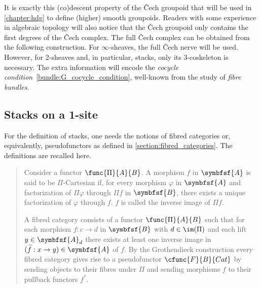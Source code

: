         It is exactly this (co)descent property of the \v{C}ech groupoid that will be used in \cref{chapter:hdg} to define (higher) smooth groupoids. Readers with some experience in algebraic topology will also notice that the \v{C}ech groupoid only contains the first degrees of the \v{C}ech complex. The full \v{C}ech complex can be obtained from the following construction.
        For $\infty$-sheaves, the full \v{C}ech nerve will be used. However, for 2-sheaves and, in particular, stacks, only its 3-coskeleton is necessary. The extra information will encode the \textit{cocycle condition}~\eqref{bundle:G_cocycle_condition}, well-known from the study of \textit{fibre bundles}.
    
    \subsection{Stacks on a 1-site}
    
        For the definition of stacks, one needs the notions of fibred categories or, equivalently, pseudofunctors as defined in \cref{section:fibred_categories}. The definitions are recalled here.
        \begin{quote}
            Consider a functor $\func{\Pi}{A}{B}$. A morphism $f$ in $\symbfsf{A}$ is said to be $\Pi$-Cartesian if, for every morphism $\varphi$ in $\symbfsf{A}$ and factorization of $\Pi\varphi$ through $\Pi f$ in $\symbfsf{B}$, there exists a unique factorization of $\varphi$ through $f$. $f$ is called the inverse image of $\Pi f$.
    
            A fibred category consists of a functor $\func{\Pi}{A}{B}$ such that for each morphism $f:c\rightarrow d$ in $\symbfsf{B}$ with $d\in\im(\Pi)$ and each lift $y\in\symbfsf{A}_d$ there exists at least one inverse image in $(\widetilde{f}:x\rightarrow y)\in\symbfsf{A}$ of $f$. By the Grothendieck construction every fibred category gives rise to a pseudofunctor $\cfunc{F}{B}{Cat}$ by sending objects to their fibres under $\Pi$ and sending morphisms $f$ to their pullback functors $f^*$.
        \end{quote}
    
